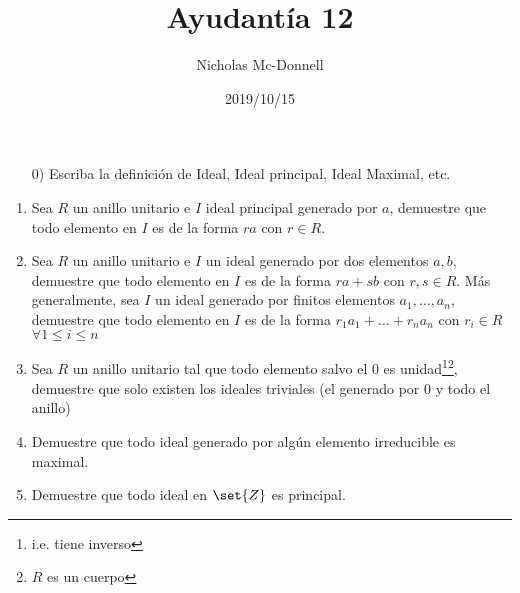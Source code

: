 \documentclass{ayudantia}
\title{Ayudantía 12}
\date{2019/10/15}
\author{Nicholas Mc-Donnell}
\begin{document}
\maketitle
\begin{itemize}
    \item[0)] Escriba la definición de Ideal, Ideal principal, Ideal Maximal, etc.
\end{itemize}
\begin{enumerate}
    \item Sea \(R\) un anillo unitario e \(I\) ideal principal generado por \(a\), demuestre que todo elemento en \(I\) es de la forma \(ra\) con \(r\in R\).
    \item Sea \(R\) un anillo unitario e \(I\) un ideal generado por dos elementos \(a,b\), demuestre que todo elemento en \(I\) es de la forma \(ra+sb\) con \(r,s\in R\). Más generalmente, sea \(I\) un ideal generado por finitos elementos \(a_1,\dots,a_n\), demuestre que todo elemento en \(I\) es de la forma \(r_1a_1+\dots+r_na_n\) con \(r_i\in R\) \(\forall 1\leq i\leq n\)
    \item Sea \(R\) un anillo unitario tal que todo elemento salvo el \(0\) es unidad\footnote{i.e. tiene inverso}\footnote{\(R\) es un cuerpo}, demuestre que solo existen los ideales triviales (el generado por \(0\) y todo el anillo)
    \item Demuestre que todo ideal generado por algún elemento irreducible es maximal.
    \item Demuestre que todo ideal en \(\set{Z}\) es principal.
\end{enumerate}
\end{document}

